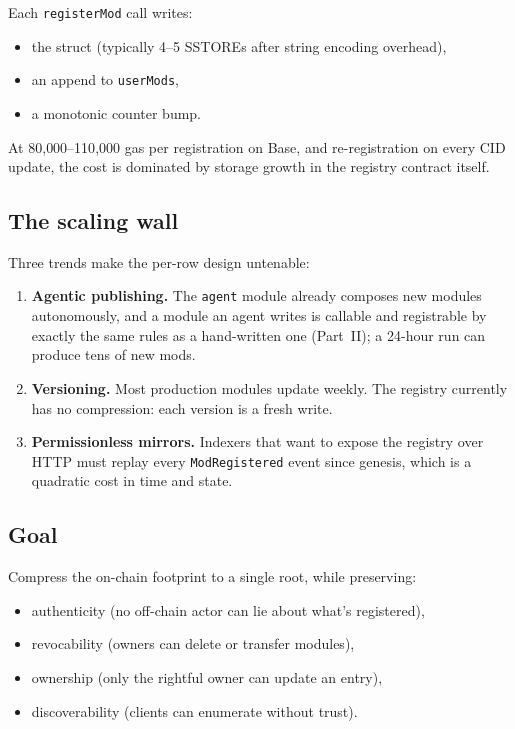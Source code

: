 \documentclass[11pt,a4paper]{article}
\begin{document}
Each \texttt{registerMod} call writes:
\begin{itemize}
    \item the struct (typically 4--5 SSTOREs after string encoding overhead),
    \item an append to \texttt{userMods},
    \item a monotonic counter bump.
\end{itemize}

At 80{,}000--110{,}000 gas per registration on Base, and re-registration on every CID update, the cost is dominated by storage growth in the registry contract itself.

\subsection{The scaling wall}

Three trends make the per-row design untenable:

\begin{enumerate}
    \item \textbf{Agentic publishing.} The \texttt{agent} module already composes new modules autonomously, and a module an agent writes is callable and registrable by exactly the same rules as a hand-written one (Part~II); a 24-hour run can produce tens of new mods.
    \item \textbf{Versioning.} Most production modules update weekly. The registry currently has no compression: each version is a fresh write.
    \item \textbf{Permissionless mirrors.} Indexers that want to expose the registry over HTTP must replay every \texttt{ModRegistered} event since genesis, which is a quadratic cost in time and state.
\end{enumerate}

\subsection{Goal}

Compress the on-chain footprint to a single root, while preserving:

\begin{itemize}
    \item authenticity (no off-chain actor can lie about what's registered),
    \item revocability (owners can delete or transfer modules),
    \item ownership (only the rightful owner can update an entry),
    \item discoverability (clients can enumerate without trust).
\end{itemize}
\end{document}
